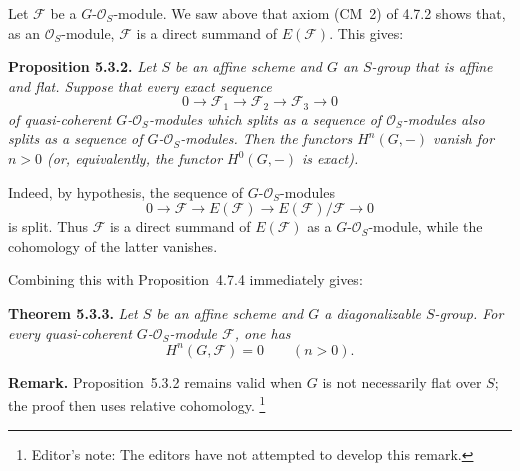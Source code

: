 Let \(\mathscr F\) be a \(G\)-\(\mathscr O_S\)-module. We saw above that
axiom (CM~2) of 4.7.2 shows that, as an \(\mathscr O_S\)-module,
\(\mathscr F\) is a direct summand of \(E(\mathscr F)\). This gives:

\medskip
\noindent\textbf{Proposition 5.3.2.}
\textit{Let \(S\) be an affine scheme and \(G\) an \(S\)-group that is
affine and flat. Suppose that every exact sequence
\[
  0\longrightarrow\mathscr F_1
   \longrightarrow\mathscr F_2
   \longrightarrow\mathscr F_3
   \longrightarrow0
\]
of quasi-coherent \(G\)-\(\mathscr O_S\)-modules which splits as a sequence
of \(\mathscr O_S\)-modules also splits as a sequence of
\(G\)-\(\mathscr O_S\)-modules. Then the functors \(H^n(G,-)\) vanish for
\(n>0\) (or, equivalently, the functor \(H^0(G,-)\) is exact).}

Indeed, by hypothesis, the sequence of \(G\)-\(\mathscr O_S\)-modules
\[
  0\longrightarrow\mathscr F
   \longrightarrow E(\mathscr F)
   \longrightarrow E(\mathscr F)/\mathscr F
   \longrightarrow0
\]
is split. Thus \(\mathscr F\) is a direct summand of \(E(\mathscr F)\) as
a \(G\)-\(\mathscr O_S\)-module, while the cohomology of the latter
vanishes.

Combining this with Proposition~4.7.4 immediately gives:

\medskip
\noindent\textbf{Theorem 5.3.3.}
\textit{Let \(S\) be an affine scheme and \(G\) a diagonalizable
\(S\)-group. For every quasi-coherent \(G\)-\(\mathscr O_S\)-module
\(\mathscr F\), one has}
\[
  H^n(G,\mathscr F)=0\qquad(n>0).
\]

\medskip
\noindent\textbf{Remark.}
Proposition~5.3.2 remains valid when \(G\) is not necessarily flat over
\(S\); the proof then uses relative cohomology.
\footnote{Editor's note: The editors have not attempted to develop this
remark.}

